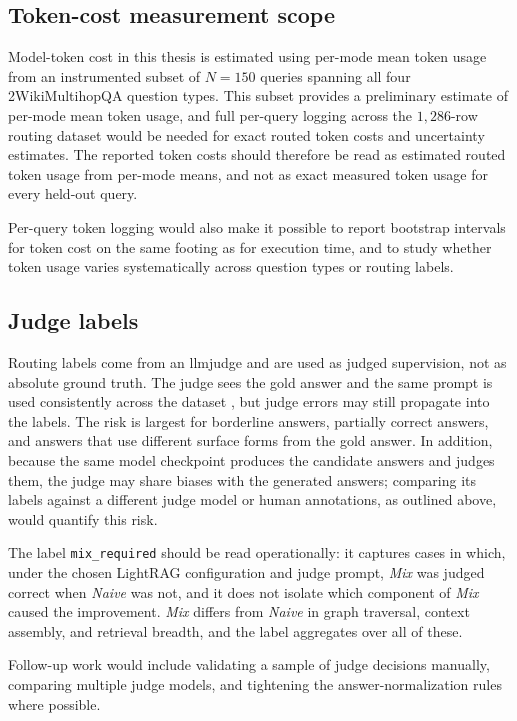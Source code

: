 \documentclass[english, bibtex]{kththesis}               %
\numberwithin{listing}{chapter}
\begin{document}
\subsection{Token-cost measurement scope}
\label{sec:limitTokenCost}

Model-token cost in this thesis is estimated using per-mode mean token usage from an instrumented subset of \(N = 150\) queries spanning all four 2WikiMultihopQA question types. This subset provides a preliminary estimate of per-mode mean token usage, and full per-query logging across the $1{,}286$-row routing dataset would be needed for exact routed token costs and uncertainty estimates. The reported token costs should therefore be read as estimated routed token usage from per-mode means, and not as exact measured token usage for every held-out query.

Per-query token logging would also make it possible to report bootstrap intervals for token cost on the same footing as for execution time, and to study whether token usage varies systematically across question types or routing labels.

\subsection{Judge labels}
\label{sec:limitJudgeLabels}

Routing labels come from an \gls{llmjudge} and are used as judged supervision, not as absolute ground truth. The judge sees the gold answer and the same prompt is used consistently across the dataset \cite{zheng2023judge}, but judge errors may still propagate into the labels. The risk is largest for borderline answers, partially correct answers, and answers that use different surface forms from the gold answer. In addition, because the same model checkpoint produces the candidate answers and judges them, the judge may share biases with the generated answers; comparing its labels against a different judge model or human annotations, as outlined above, would quantify this risk.

The label \texttt{mix\_required} should be read operationally: it captures cases in which, under the chosen LightRAG configuration and judge prompt, \emph{Mix} was judged correct when \emph{Naive} was not, and it does not isolate which component of \emph{Mix} caused the improvement. \emph{Mix} differs from \emph{Naive} in graph traversal, context assembly, and retrieval breadth, and the label aggregates over all of these.

Follow-up work would include validating a sample of judge decisions manually, comparing multiple judge models, and tightening the answer-normalization rules where possible.
\end{document}
